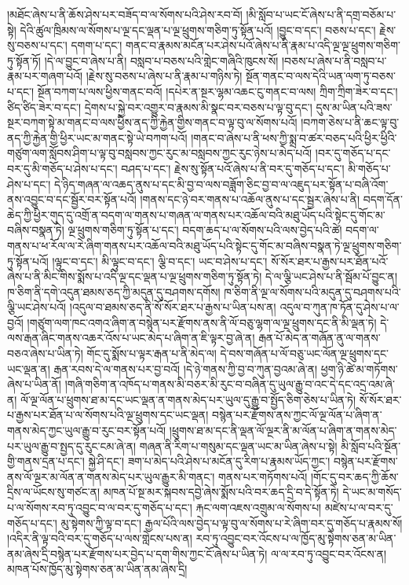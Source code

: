 །མཐོང་ཞེས་པ་ནི་ཆོས་ཤེས་པར་བཟོད་བ་ལ་སོགས་པའི་ཤེས་རབ་བོ། །མི་སློབ་པ་ཡང་ངོ་ཞེས་པ་ནི་དགྲ་བཅོམ་པ་སྟེ། དེའི་ཚུལ་ཁྲིམས་ལ་སོགས་པ་ལྔ་དང་ལྡན་པ་ལྔ་ཕྲུགས་གཅིག་ཏུ་སྟོན་པའོ། །བྱུང་བ་དང་། བཅས་པ་དང་། རྗེས་སུ་བཅས་པ་དང་། དགག་པ་དང་། གནང་བ་རྣམས་མངོན་པར་ཤེས་པའོ་ཞེས་པ་ནི་རྣམ་པ་འདི་ལྔ་ལྔ་ཕྲུགས་གཅིག་ཏུ་སྟོན་ཏོ། །དེ་ལ་བྱུང་བ་ཞེས་པ་ནི། བསླབ་པ་བཅས་པའི་གླེང་གཞིའི་ཁུངས་སོ། །བཅས་པ་ཞེས་པ་ནི་བསླབ་པ་རྣམ་པར་གཞག་པའོ། །རྗེས་སུ་བཅས་པ་ཞེས་པ་ནི་རྣམ་པ་གཉིས་ཏེ། སྔོན་གནང་བ་ལས་དེའི་ཡན་ལག་ཏུ་བཅས་པ་དང་། སྔོན་བཀག་པ་ལས་ཕྱིས་གནང་བའོ། །དཔེར་ན་སྔར་ལྷམ་འཆང་ངུ་གནང་བ་ལས། ཀྲིག་ཀྲིག་ཟེར་བ་དང་། ཙིད་ཙིད་ཟེར་བ་དང་། དྲེགས་པ་སྐྱེ་བར་འགྱུར་བ་རྣམས་མི་སྣང་བར་བཅས་པ་ལྟ་བུ་དང་། དུས་མ་ཡིན་པའི་ཟས་སྔར་བཀག་སྟེ་མ་གནང་བ་ལས་ཕྱིས་ནད་ཀྱི་རྐྱེན་གྱིས་གནང་བ་ལྟ་བུ་ལ་སོགས་པའོ། །བཀག་ཅེས་པ་ནི་ཆང་ལྟ་བུ་ནད་ཀྱི་རྐྱེན་གྱི་ཕྱིར་ཡང་མ་གནང་སྟེ་ཡེ་བཀག་པའོ། །གནང་བ་ཞེས་པ་ནི་ཕས་ཀྱི་སྨྲ་བ་ཚར་བཅད་པའི་ཕྱིར་ཕྱིའི་གཙུག་ལག་སློབས་ཤིག་པ་ལྟ་བུ་བསླབས་ཀྱང་རུང་མ་བསླབས་ཀྱང་རུང་ཉེས་པ་མེད་པའོ། །བར་དུ་གཅོད་པ་དང་བར་དུ་མི་གཅོད་པ་ཤེས་པ་དང་། བཤད་པ་དང་། རྗེས་སུ་སྟོན་པའོ་ཞེས་པ་ནི་བར་དུ་གཅོད་པ་དང་། མི་གཅོད་པ་ཤེས་པ་དང་། དེ་ཉིད་གཞན་ལ་འཆད་ནུས་པ་དང་མི་བྱ་བ་ལས་བཟློག་ཅིང་བྱ་བ་ལ་འཇུད་པར་སྟོན་པ་བཞི་འོག་ནས་འབྱུང་བ་དང་སྦྱོར་བར་སྟོན་པའོ། །གནས་དང་ཉེ་བར་གནས་པ་འཆོལ་ནུས་པ་དང་སྦྱར་ཞེས་པ་ནི། བདག་དོན་ཆེད་ཀྱི་ཕྱིར་གུད་དུ་འགྲོ་ན་བདག་ལ་གནས་པ་གཞན་ལ་གནས་པར་འཆོལ་བའི་མཐུ་ཡོད་པའི་སྟེང་དུ་གོང་མ་བཞིས་བསྣན་ཏེ། ལྔ་ཕྲུགས་གཅིག་ཏུ་སྟོན་པ་དང་། བདག་ཆད་པ་ལ་སོགས་པའི་ལས་བྱེད་པའི་ཚེ། བདག་ལ་གནས་པ་ཕ་རོལ་ལ་རེ་ཞིག་གནས་པར་འཆོལ་བའི་མཐུ་ཡོད་པའི་སྟེང་དུ་གོང་མ་བཞིས་བསྣན་ཏེ་ལྔ་ཕྲུགས་གཅིག་ཏུ་སྟོན་པའོ། །ལྟུང་བ་དང་། མི་ལྟུང་བ་དང་། ལྕི་བ་དང་། ཡང་བ་ཤེས་པ་དང་། སོ་སོར་ཐར་པ་རྒྱས་པར་ཐོན་པའོ་ཞེས་པ་ནི་མིང་གིས་སྨོས་པ་འདི་ལྔ་དང་ལྡན་པ་ལྔ་ཕྲུགས་གཅིག་ཏུ་སྟོན་ཏེ། དེ་ལ་ལྕི་ཡང་ཤེས་པ་ནི་སྦོམ་པོ་བྱུང་ན། ཁ་ཅིག་ནི་དགེ་འདུན་ཐམས་ཅད་ཀྱི་མདུན་དུ་བཤགས་དགོས། ཁ་ཅིག་ནི་ལྔ་ལ་སོགས་པའི་མདུན་དུ་བཤགས་པའི་ལྕི་ཡང་ཤེས་པའོ། །འདུལ་བ་ཐམས་ཅད་ནི་སོ་སོར་ཐར་པ་རྒྱས་པ་ཡིན་པས་ན། འདུལ་བ་ཀུན་ཁ་ཏོན་དུ་ཤེས་པ་ལ་བྱའོ། །གཙུག་ལག་ཁང་འགའ་ཞིག་ན་བསྙེན་པར་རྫོགས་ནས་ནི་ལོ་བཅུ་ལྷག་ལ་ལྔ་ཕྲུགས་དང་ནི་མི་ལྡན་ཏེ། དེ་ལས་རྒན་ཞིང་གནས་འཆར་འོས་པ་ཡང་མེད་པ་ཞིག་ན་ཇི་ལྟར་བྱ་ཞེ་ན། རྒན་པོ་མེད་ན་གཞོན་ནུ་ལ་གནས་བཅའ་ཞེས་པ་ཡིན་ཏེ། གོང་དུ་སྨོས་པ་ལྟར་རྒན་པ་ནི་མེད་ལ། དེ་བས་གཞོན་པ་ལོ་བཅུ་ཡང་ལོན་ལྔ་ཕྲུགས་དང་ཡང་ལྡན་ན། རྒན་རབས་དེ་ལ་གནས་པར་བྱ་བའོ། །དེ་ཉེ་གནས་ཀྱི་བྱ་བ་ཀུན་བྱའམ་ཞེ་ན། ཕྱག་ཉི་ཚེ་མ་གཏོགས་ཞེས་པ་ཡིན་ནོ། །གཞི་གཅིག་ན་འཁོད་པ་གནས་མི་བཅར་མི་རུང་བ་བཞིན་དུ་ཡུལ་རྒྱུ་བ་འང་དེ་དང་འདྲ་འམ་ཞེ་ན། ལོ་ལྔ་ལོན་པ་ཕྲུགས་ཐ་མ་དང་ཡང་ལྡན་ན་གནས་མེད་པར་ཡུལ་དུ་རྒྱུ་བ་སྤྱོད་ཅིག་ཅེས་པ་ཡིན་ཏེ། སོ་སོར་ཐར་པ་རྒྱས་པར་ཐོན་པ་ལ་སོགས་པའི་ལྔ་ཕྲུགས་དང་ཡང་ལྡན། བསྙེན་པར་རྫོགས་ནས་ཀྱང་ལོ་ལྔ་ལོན་པ་ཞིག་ན་གནས་མེད་ཀྱང་ཡུལ་རྒྱུ་བ་རུང་བར་སྟོན་པའོ། །ཕྲུགས་ཐ་མ་དང་ནི་ལྡན་ལོ་ལྔར་ནི་མ་ལོན་པ་ཞིག་ན་གནས་མེད་པར་ཡུལ་རྒྱུ་བ་སྤྱད་དུ་རུང་ངམ་ཞེ་ན། གཞན་ནི་རིག་པ་གསུམ་དང་ལྡན་ཡང་མ་ཡིན་ཞེས་པ་སྟེ། མི་སློབ་པའི་སྔོན་གྱི་གནས་དྲན་པ་དང་། སྐྱེ་ཤི་དང་། ཟག་པ་མེད་པའི་ཤེས་པ་མངོན་དུ་རིག་པ་རྣམས་ཡོད་ཀྱང་། བསྙེན་པར་རྫོགས་ནས་ལོ་ལྔར་མ་ལོན་ན་གནས་མེད་པར་ཡུལ་རྒྱུར་མི་གནང་། གནས་པར་གཏོགས་པའོ། །གོང་དུ་བར་ཆད་ཀྱི་ཆོས་དྲིས་ལ་ཡོངས་སུ་གཙང་ན། མཁན་པོ་སྔ་མར་སྐབས་དབྱེ་ཞེས་སྨོས་པའི་བར་ཆད་དྲི་བ་དེ་སྟོན་ཏེ། དེ་ཡང་མ་གསོད་པ་ལ་སོགས་རབ་ཏུ་འབྱུང་བ་ལ་བར་དུ་གཅོད་པ་དང་། རྐང་ལག་འཇས་འགྲུམ་ལ་སོགས་པ། མཛེས་པ་ལ་བར་དུ་གཅོད་པ་དང་། མུ་སྟེགས་ཀྱི་ལྟ་བ་དང་། རྒྱལ་པོའི་ལས་བྱེད་པ་ལྟ་བུ་ལ་སོགས་པ་རེ་ཞིག་བར་དུ་གཅོད་པ་རྣམས་སོ། །འདིར་ནི་ལྟ་བའི་བར་དུ་གཅོད་པ་ལས་གླེངས་པས་ན། རབ་ཏུ་འབྱུང་བར་འོངས་པ་ལ་ཁྱོད་མུ་སྟེགས་ཅན་མ་ཡིན་ནམ་ཞེས་དྲི་བསྙེན་པར་རྫོགས་པར་བྱེད་པ་དག་གིས་ཀྱང་ངོ་ཞེས་པ་ཡིན་ཏེ། ལ་ལ་རབ་ཏུ་འབྱུང་བར་འོངས་ན། མཁན་པོས་ཁྱོད་མུ་སྟེགས་ཅན་མ་ཡིན་ནམ་ཞེས་དྲི། 